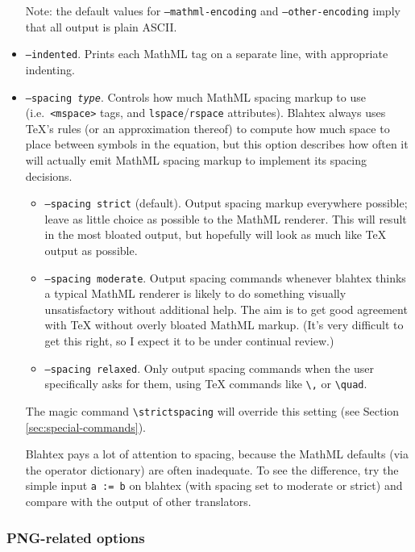 \documentclass{article}
\newcommand{\texcommand}[1]{\textbackslash{}#1}
\begin{document}
\begin{itemize}
Note: the default values for \texttt{--mathml-encoding} and \texttt{--other-encoding} imply that all output is plain ASCII.
\item \texttt{--indented}. Prints each MathML tag on a separate line, with appropriate indenting.
\item \texttt{--spacing \textit{type}}. Controls how much MathML spacing markup to use (i.e.~\texttt{<mspace>} tags, and \texttt{lspace}/\texttt{rspace} attributes). Blahtex always uses \TeX{}'s rules (or an approximation thereof) to compute how much space to place between symbols in the equation, but this option describes how often it will actually emit MathML spacing markup to implement its spacing decisions.
\begin{itemize}
\item \texttt{--spacing strict} (default). Output spacing markup everywhere possible; leave as little choice as possible to the MathML renderer. This will result in the most bloated output, but hopefully will look as much like \TeX{} output as possible.
\item \texttt{--spacing moderate}. Output spacing commands whenever blahtex thinks a typical MathML renderer is likely to do something visually unsatisfactory without additional help. The aim is to get good agreement with \TeX{} without overly bloated MathML markup. (It's very difficult to get this right, so I expect it to be under continual review.)
\item \texttt{--spacing relaxed}. Only output spacing commands when the user specifically asks for them, using \TeX{} commands like \texttt{\texcommand{,}} or \texttt{\texcommand{quad}}.
\end{itemize}
The magic command \texttt{\texcommand{strictspacing}} will override this setting (see Section \ref{sec:special-commands}).

Blahtex pays a lot of attention to spacing, because the MathML defaults (via the operator dictionary) are often inadequate. To see the difference, try the simple input \texttt{a := b} on blahtex (with spacing set to moderate or strict) and compare with the output of other translators.
\end{itemize}

\subsubsection{PNG-related options}
\end{document}
